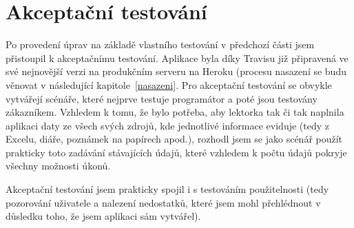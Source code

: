     \section{Akceptační testování}
    Po provedení úprav na základě vlastního testování v předchozí části jsem přistoupil k akceptačnímu testování. Aplikace byla díky Travisu již připravená ve své nejnovější verzi na produkčním serveru na Heroku (procesu nasazení se budu věnovat v následující kapitole~\ref{nasazeni}. Pro akceptační testování se obvykle vytvářejí scénáře, které nejprve testuje programátor a poté jsou testovány zákazníkem. Vzhledem k tomu, že bylo potřeba, aby lektorka tak či tak naplnila aplikaci daty ze všech svých zdrojů, kde jednotlivé informace eviduje (tedy z Excelu, diáře, poznámek na papírech apod.), rozhodl jsem se jako scénář použít prakticky toto zadávání stávajících údajů, které vzhledem k počtu údajů pokryje všechny možnosti úkonů.
    
    Akceptační testování jsem prakticky spojil i s testováním použitelnosti (tedy pozorování uživatele a nalezení nedostatků, které jsem mohl přehlédnout v důsledku toho, že jsem aplikaci sám vytvářel).
    

